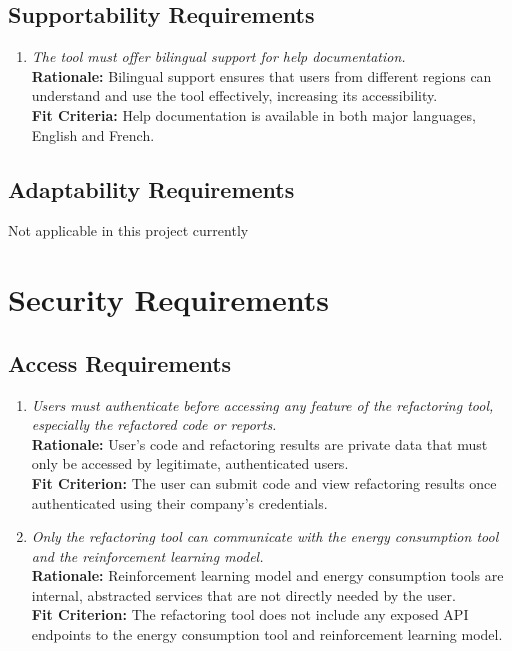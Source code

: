 \documentclass[12pt]{article}
\begin{document}
\subsection{Supportability Requirements}
\begin{enumerate}[label=MS-SP \arabic*., wide=0pt, leftmargin=*]
  \item \emph{The tool must offer bilingual support for help documentation.}\\
  {\bf Rationale:} Bilingual support ensures that users from different regions can understand and use the tool effectively, increasing its accessibility.\\
  {\bf Fit Criteria:} Help documentation is available in both major languages, English and French.
\end{enumerate}

\subsection{Adaptability Requirements}
Not applicable in this project currently

\section{Security Requirements}
\subsection{Access Requirements}
\begin{enumerate}[label=SR-AR \arabic*., wide=0pt, leftmargin=*]
	\item \emph{Users must authenticate before accessing any feature of the refactoring tool, especially the refactored code or reports.}\\[2mm]
    {\bf Rationale:} User’s code and refactoring results are private data that must only be accessed by legitimate, authenticated users. \\
    {\bf Fit Criterion:} The user can submit code and view refactoring results once authenticated using their company’s credentials.
  \item \emph{Only the refactoring tool can communicate with the energy consumption tool and the reinforcement learning model.}\\
  {\bf Rationale:} Reinforcement learning model and energy consumption tools are internal, abstracted services that are not directly needed by the user.\\
  {\bf Fit Criterion:} The refactoring tool does not include any exposed API endpoints to the energy consumption tool and reinforcement learning model.
\end{enumerate}
\end{document}
